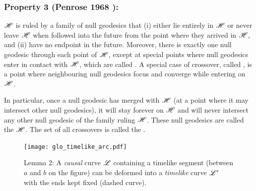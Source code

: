 \subsubsection{Property 3 (Penrose 1968 \cite{Penro68}):}
\begin{greybox}
$\mathscr{H}$ is ruled by a family of null geodesics that (i) either lie entirely
in $\mathscr{H}$ or never leave $\mathscr{H}$ when followed into the future from the
point where they arrived in $\mathscr{H}$, and
(ii) have no endpoint in the future.
Moreover, there is exactly one null geodesic through each point of $\mathscr{H}$,
except at special points where null geodesics enter in contact with $\mathscr{H}$, which are
called . A special case
of crossover, called , is a point
where neighbouring null geodesics focus and converge while entering on $\mathscr{H}$.
\end{greybox}
In particular, once a null geodesic has
merged with $\mathscr{H}$ (at a point where it may intersect other null geodesics),
it will stay forever on $\mathscr{H}$ and will never intersect any other null geodesic
of the family ruling $\mathscr{H}$. These null geodesics are called the
 $\mathscr{H}$.
The set of all crossovers is called the 
\cite{Siino98a,Siino98b,Brill14}.

\begin{figure}
\centerline{\texttt{[image: glo\_timelike\_arc.pdf]}}
\caption[]{\label{f:glo:timelike_arc} \footnotesize
Lemma 2: A \emph{causal} curve $\mathscr{L}$ containing a timelike segment (between
$a$ and $b$ on the figure) can be deformed into a \emph{timelike} curve $\mathscr{L}'$
with the ends kept fixed (dashed curve).}
\end{figure}


